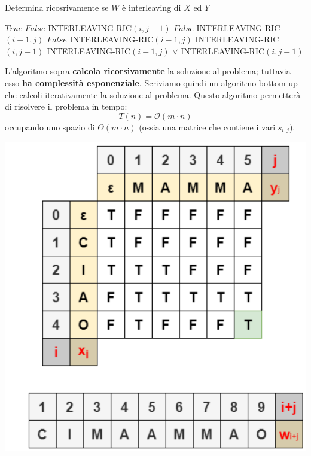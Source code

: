 \documentclass[12pt]{article}
\begin{document}
\begin{algorithm}[H]
    \caption{Determina ricosrivamente se $W$ è interleaving di $X$ ed $Y$}
    \DontPrintSemicolon
     {
         {
            \Return $True$
        }
         {
            \Return $False$
        }
         {
             {
                \Return INTERLEAVING-RIC$(i, j-1)$
            } {
                \Return $False$
            }
        }
         {
             {
                \Return INTERLEAVING-RIC$(i-1, j)$
            } {
                \Return $False$
            }
        }
         {
            \Return INTERLEAVING-RIC$(i-1, j)$
        }
         {
            \Return INTERLEAVING-RIC$(i, j-1)$
        }
         {
            \Return INTERLEAVING-RIC$(i-1, j)$ $\vee$ INTERLEAVING-RIC$(i, j-1)$
        }
    }
\end{algorithm} \noindent
L'algoritmo sopra \textbf{calcola ricorsivamente} la soluzione al problema; tuttavia esso \textbf{ha complessità esponenziale}.
Scriviamo quindi un algoritmo bottom-up che calcoli iterativamente la soluzione al problema. Questo algoritmo permetterà
di risolvere il problema in tempo:
$$T(n) = \mathcal{O}(m \cdot n)$$
occupando uno spazio di $\Theta(m \cdot n)$ (ossia una matrice che contiene i vari $s_{i,j}$). \newline
\begin{center}
    \includegraphics[width = 0.40\linewidth]{Images/14.png}
\end{center}
\end{document}
